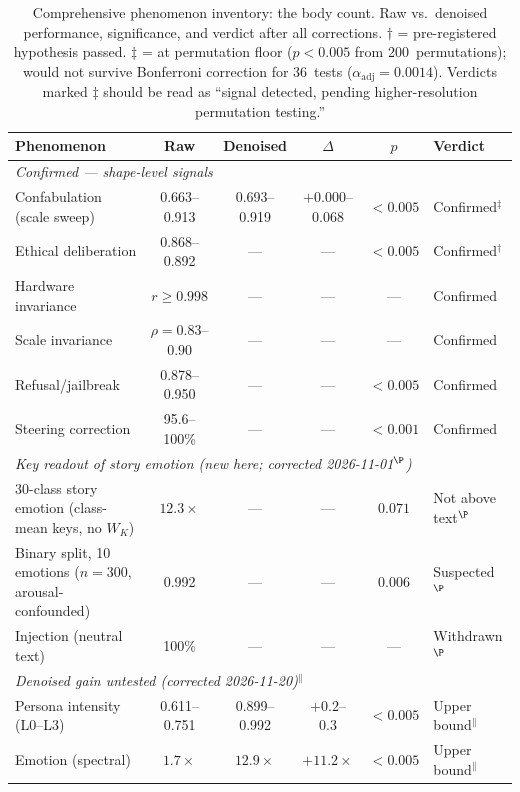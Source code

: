 \documentclass[11pt,a4paper]{article}
\begin{document}
\begin{table}[h!]
\centering
\small
\caption{Comprehensive phenomenon inventory: the body count. Raw vs.\
  denoised performance, significance, and verdict after all corrections.
  $\dagger$ = pre-registered hypothesis passed.
  $\ddagger$ = at permutation floor ($p < 0.005$ from 200~permutations);
  would not survive Bonferroni correction for 36~tests ($\alpha_{\text{adj}} = 0.0014$).
  Verdicts marked $\ddagger$ should be read as ``signal detected, pending
  higher-resolution permutation testing.''}
\label{tab:body_count}
\begin{tabular}{p{3.5cm}ccccl}
\toprule
\textbf{Phenomenon} & \textbf{Raw} & \textbf{Denoised} & \textbf{$\Delta$} & \textbf{$p$} & \textbf{Verdict} \\
\midrule
\multicolumn{6}{l}{\textit{Confirmed --- shape-level signals}} \\
Confabulation (scale sweep) & 0.663--0.913 & 0.693--0.919 & $+0.000$--$0.068$ & $<0.005$ & Confirmed$^\ddagger$ \\
Ethical deliberation & 0.868--0.892 & --- & --- & $<0.005$ & Confirmed$^\dagger$ \\
Hardware invariance & $r \geq 0.998$ & --- & --- & --- & Confirmed \\
Scale invariance & $\rho=0.83$--$0.90$ & --- & --- & --- & Confirmed \\
Refusal/jailbreak & 0.878--0.950 & --- & --- & $<0.005$ & Confirmed \\
Steering correction & 95.6--100\% & --- & --- & $<0.001$ & Confirmed \\
\midrule
\multicolumn{6}{l}{\textit{Key readout of story emotion (new here; corrected 2026-11-01$^{\P}$)}} \\
30-class story emotion (class-mean keys, no $W_K$) & $12.3\times$ & --- & --- & $0.071$ & Not above text$^{\P}$ \\
Binary split, 10 emotions ($n{=}300$, arousal-confounded) & 0.992 & --- & --- & $0.006$ & Suspected$^{\P}$ \\
Injection (neutral text) & 100\% & --- & --- & --- & Withdrawn$^{\P}$ \\
\midrule
\multicolumn{6}{l}{\textit{Denoised gain untested (corrected 2026-11-20)$^\|$}} \\
Persona intensity (L0--L3) & 0.611--0.751 & 0.899--0.992 & $+0.2$--$0.3$ & $<0.005$ & Upper bound$^\|$ \\
Emotion (spectral) & $1.7\times$ & $12.9\times$ & $+11.2\times$ & $<0.005$ & Upper bound$^\|$ \\

\end{tabular}
\end{table}
\end{document}

